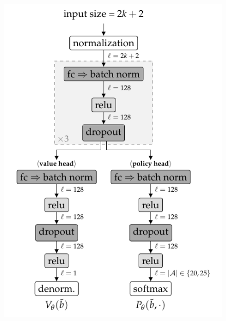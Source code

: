 \begin{figure}[ht!]
\begin{minipage}{0.28\textwidth}
{            \includegraphics{diagrams/betazero/nn-rocksample.pdf}
        }
    \end{minipage}
    \hfill
    \begin{minipage}{0.26\textwidth}
        \resizebox{\textwidth}{!}{%
}
\end{minipage}
\end{figure}
